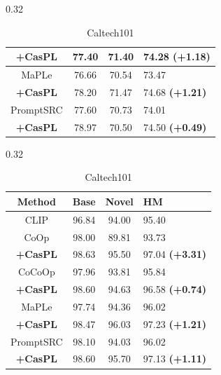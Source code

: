 \documentclass[runningheads]{llncs}
\newcommand{\improve}[1]{\textcolor{boost_line}{\textbf{#1}}}
\begin{document}
{{\begin{table}[!t]
\begin{subtable}[t]{0.32\linewidth}
{\begin{tabular}{c|ccl}
            \rowcolor{tablecolor} \textbf{+CasPL} &77.40 	&71.40 	&74.28   \improve{(+1.18)} \\
            \hline
            MaPLe   & 76.66 & 70.54 & 73.47 \\
            \rowcolor{tablecolor} \textbf{+CasPL} &78.20 	&71.47 	&74.68  \improve{(+1.21)}\\
            \hline
            PromptSRC & 77.60 & 70.73 & 74.01 \\
            \rowcolor{tablecolor} \textbf{+CasPL} &78.97 	&70.50 	&74.50  \improve{(+0.49)} \\
            \hline
        \end{tabular}
        }
        \caption{ImageNet}
    \end{subtable}
    \begin{subtable}[t]{0.32\linewidth}
        \resizebox{0.96\linewidth}{!}
        {
        \begin{tabular}{c|ccl}
            \hline
            Method    & Base  & Novel & HM \\
            \hline
            CLIP & 96.84 & 94.00 & 95.40 \\
            \hline
            CoOp & 98.00 & 89.81 & 93.73 \\
            \rowcolor{tablecolor} \textbf{+CasPL} &98.63 	&95.50 	&97.04     \improve{(+3.31)}  \\
            \hline
            CoCoOp & 97.96 & 93.81 & 95.84 \\
            \rowcolor{tablecolor} \textbf{+CasPL} &98.60 	 &94.63 	 &96.58    \improve{(+0.74)} \\
            \hline
            MaPLe & 97.74 & 94.36 & 96.02 \\
            \rowcolor{tablecolor} \textbf{+CasPL} &98.47 	&96.03 	&97.23   \improve{(+1.21)} \\
            \hline
            PromptSRC & 98.10 & 94.03 & 96.02 \\
            \rowcolor{tablecolor} \textbf{+CasPL} &98.60 	&95.70 	&97.13   \improve{(+1.11)} \\
            \hline
        \end{tabular}
        }
        \caption{Caltech101}
    \end{subtable}
    
    

\end{table}}}
\end{document}
